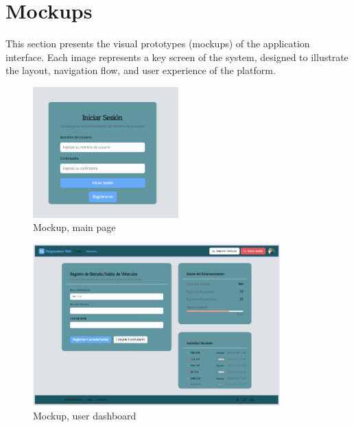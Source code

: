 \section{Mockups}

This section presents the visual prototypes (mockups) of the application interface. 
Each image represents a key screen of the system, designed to illustrate the layout, 
navigation flow, and user experience of the platform.

\begin{figure}[h!]
    \centering
    \includegraphics[width=0.5\textwidth]{Mockups/mkup-2.png}
    \caption{Mockup, main page}
    \label{fig:mkup-1}
\end{figure}

\begin{figure}[h!]
    \centering
    \includegraphics[width=0.85\textwidth]{Mockups/mkup-1.jpeg}
    \caption{Mockup, user dashboard}
    \label{fig:mkup-2}
\end{figure}

